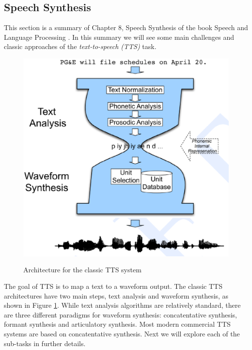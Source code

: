 \documentclass[paper=a4, fontsize=18pt]{article} %
\numberwithin{equation}{section} %
\numberwithin{figure}{section} %
\numberwithin{table}{section} %
\begin{document}
\subsection{Speech Synthesis \cite{Jurafsky2014Speech}}

This section is a summary of Chapter 8, Speech Synthesis of the book Speech and Language Processing \cite{Jurafsky2014Speech}. In this summary we will see some main challenges and classic approaches of the \emph{text-to-speech (TTS)} task.

\begin{figure}[htbp]
  \centering
  \includegraphics[width=.5\linewidth]{10_17_tts_arch}\\
  \caption{Architecture for the classic TTS system}\label{fig:TTS_arch}
\end{figure}

The goal of TTS is to map a text to a waveform output. The classic TTS architectures have two main steps, text analysis and waveform synthesis, as shown in Figure \ref{fig:TTS_arch}. While text analysis algorithms are relatively standard, there are three different paradigms for waveform synthesis: concatentative synthesis, formant synthesis and articulatory synthesis. Most modern commercial TTS systems are based on concatentative synthesis. Next we will explore each of the sub-tasks in further details.
\end{document}
